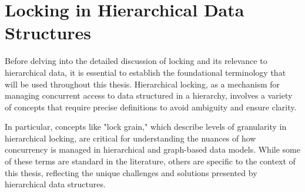 





\section{Locking in Hierarchical Data Structures}
Before delving into the detailed discussion of locking and its relevance to hierarchical data, it is essential to establish the foundational terminology that will be used throughout this thesis. Hierarchical locking, as a mechanism for managing concurrent access to data structured in a hierarchy, involves a variety of concepts that require precise definitions to avoid ambiguity and ensure clarity.

In particular, concepts like "lock grain," which describe levels of granularity in hierarchical locking, are critical for understanding the nuances of how concurrency is managed in hierarchical and graph-based data models. While some of these terms are standard in the literature, others are specific to the context of this thesis, reflecting the unique challenges and solutions presented by hierarchical data structures.

